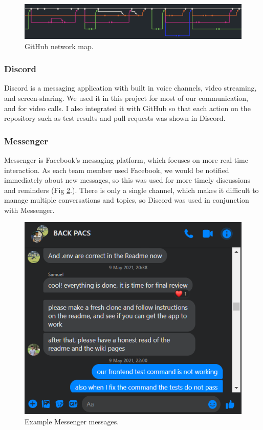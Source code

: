 \documentclass[conference]{IEEEtran}
\begin{document}
\begin{figure}[htbp]
\centerline{\includegraphics[width = \linewidth]{github-network.png}}
\caption{GitHub network map.}
\label{github}
\end{figure}

\subsubsection{Discord}
Discord is a messaging application with built in voice channels, video streaming, and screen-sharing. We used it in this project for most of our communication, and for video calls. I also integrated it with GitHub so that each action on the repository such as test results and pull requests was shown in Discord.

\subsubsection{Messenger}
Messenger is Facebook's messaging platform, which focuses on more real-time interaction. As each team member used Facebook, we would be notified immediately about new messages, so this was used for more timely discussions and reminders (Fig \ref{messenger}.). There is only a single channel, which makes it difficult to manage multiple conversations and topics, so Discord was used in conjunction with Messenger.

\begin{figure}[htbp]
\centerline{\includegraphics[width = \linewidth]{messenger.png}}
\caption{Example Messenger messages.}
\label{messenger}
\end{figure}
\end{document}
